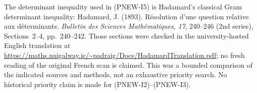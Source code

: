 The determinant inequality used in (PNEW-I5) is Hadamard's classical
Gram determinant inequality: Hadamard, J. (1893).
R\'esolution d'une question relative aux d\'eterminants.
\emph{Bulletin des Sciences Math\'ematiques, 17}, 240--246
(2nd series), Sections~2--4, pp.~240--242.
Those sections were checked in the university-hosted English
translation at
\url{https://maths.nuigalway.ie/~padraig/Docs/HadamardTranslation.pdf};
no fresh reading of the original French scan is claimed.
This was a bounded comparison of the indicated sources and methods,
not an exhaustive priority search. No historical priority claim is
made for (PNEW-I2)--(PNEW-I3).
